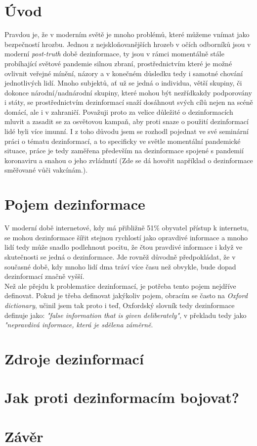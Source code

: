 \section*{Úvod}
Pravdou je, že v moderním světě je mnoho problémů, které můžeme vnímat jako bezpečností hrozbu. Jednou z nejskloňovanějších hrozeb v očích odborníků jsou v moderní \textit{post-truth} době dezinformace, ty jsou v rámci momentálně stále probíhající světové pandemie silnou zbraní, prostřednictvím které je možné ovlivnit veřejné mínění, názory a v konečném důsledku tedy i samotné chování jednotlivých lidí. Mnoho subjektů, ať už se jedná o individua, větší skupiny, či dokonce národní/nadnárodní skupiny, které mohou být nezřídkakdy podporovány i státy, se prostřednictvím dezinformací snaží dosáhnout svých cílů nejen na scéně domácí, ale i v zahraničí. Považuji proto za velice důležité o dezinformacích mluvit a zasadit se za osvětovou kampaň, aby proti snaze o použití dezinformací lidé byli více imunní. I z toho důvodu jsem se rozhodl pojednat ve své seminární práci o tématu dezinformací, a to specificky ve světle momentální pandemické situace, práce je tedy zaměřena především na dezinformace spojené s pandemií koronaviru a snahou o jeho zvládnutí (Zde se dá hovořit například o dezinformace směřované vůči vakcínám.).

\section{Pojem dezinformace}

V moderní době internetové, kdy má přibližně 51\% obyvatel přístup k internetu\cite{noauthor_individuals_nodate}, se mohou dezinformace šířit stejnou rychlostí jako opravdivé informace a mnoho lidí tedy může snadlo podlehnout pocitu, že čtou pravdivé informace i když ve skutečnosti se jedná o dezinformace. Jde rovněž důvodně předpokládat, že v současné době, kdy mnoho lidí dma tráví více času než obvykle, bude dopad dezinformací značně vyšší.\\

Než ale přejdu k problematice dezinformací, je potřeba tento pojem nejdříve definovat. Pokud je třeba definovat jakýkoliv pojem, obracím se často na \textit{Oxford dictionary}, učinil jsem tak proto i teď, Oxfordský slovník tedy dezinformace definuje jako: \textit{"false information that is given deliberately"}\cite{noauthor_disinformation_nodate}, v překladu tedy jako \textit{"nepravdivá informace, která je sdělena záměrně}.

\section{Zdroje dezinformací}

\section{Jak proti dezinformacím bojovat?}

\section{Závěr}